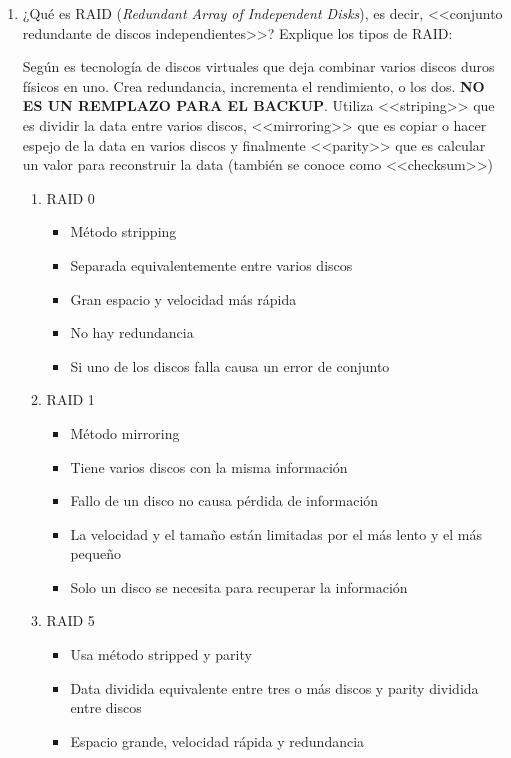 \documentclass[stu, 12pt, letterpaper, donotrepeattitle, floatsintext, natbib, helv]{apa7}
\begin{document}
\begin{enumerate}
    \item ¿Qué es RAID (\textit{Redundant Array of Independent Disks}), es decir, <<conjunto redundante de discos independientes>>? Explique los tipos de RAID:
    
    Según \cite{RAID} es tecnología de discos virtuales que deja combinar varios discos duros físicos en uno. Crea redundancia, incrementa el rendimiento, o los dos. \textbf{NO ES UN REMPLAZO PARA EL BACKUP}. Utiliza <<striping>> que es dividir la data entre varios discos, <<mirroring>> que es copiar o hacer espejo de la data en varios discos y finalmente <<parity>> que es calcular un valor para reconstruir la data (también se conoce como <<checksum>>) 
    \begin{enumerate}
        \item RAID 0
        \begin{itemize}
            \item Método stripping
            \item Separada equivalentemente entre varios discos
            \item Gran espacio y velocidad más rápida
            \item No hay redundancia
            \item Si uno de los discos falla causa un error de conjunto
        \end{itemize}
        \item RAID 1
        \begin{itemize}
            \item Método mirroring
            \item Tiene varios discos con la misma información
            \item Fallo de un disco no causa pérdida de información
            \item La velocidad y el tamaño están limitadas por el más lento y el más pequeño
            \item Solo un disco se necesita para recuperar la información
        \end{itemize}
        \item RAID 5
        \begin{itemize}
            \item Usa método stripped y parity
            \item Data dividida equivalente entre tres o más discos y parity dividida entre discos
            \item Espacio grande, velocidad rápida y redundancia

\end{itemize}
\end{enumerate}
\end{enumerate}
\end{document}
